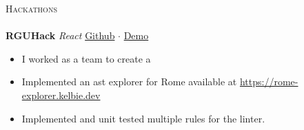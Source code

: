 \documentclass[a4paper]{article}
\newcommand{\lineunder} {
    \vspace*{-8pt} \\
    \hspace*{-18pt} \hrulefill \\
}
\newcommand{\header} [1] {
    {\hspace*{-18pt}\vspace*{6pt} \textsc{#1}}
    \vspace*{-6pt} \lineunder
}
\begin{document}
\header{Hackathons}
\textbf{RGUHack} {\sl React} \hfill  \href{https://github.com/Kelbie/rgu-hack-climate-website}{Github} $\cdot$ \href{https://www.youtube.com/watch?v=3jv-3uo-xhk}{Demo}\\
\vspace*{-1mm}
\begin{itemize} \itemsep 1pt
	\item I worked as a team to create a 
	\item Implemented an ast explorer for Rome available at \href{https://rome-explorer.kelbie.dev}{https://rome-explorer.kelbie.dev}
	\item Implemented and unit tested multiple rules for the linter.
\end{itemize}
\vspace*{2mm}
\end{document}

